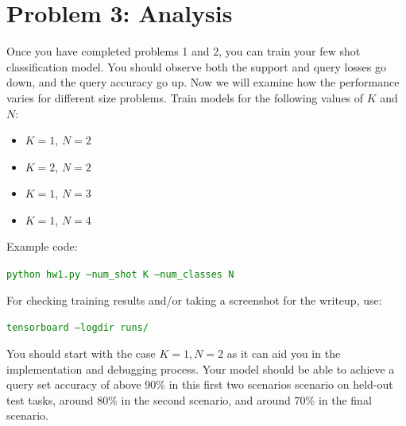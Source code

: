 \documentclass[12pt]{article}
\begin{document}
\section*{Problem 3: Analysis}

Once you have completed problems 1 and 2, you can train your few shot classification model. You should observe both the support and query losses go down, and the query accuracy go up. Now we will examine how the performance varies for different size problems.
Train models for the following values of $K$ and $N$:
\begin{itemize}
    \item $K = 1$, $N=2$ %
    \item $K = 2$, $N=2$ %
    \item $K = 1$, $N=3$ %
    \item $K = 1$, $N=4$ %
\end{itemize}

Example code:

\textcolor{green}{\texttt{python hw1.py --num\_shot K --num\_classes N}}

For checking training results and/or taking a screenshot for the writeup, use:

\textcolor{green}{\texttt{tensorboard --logdir runs/}}

You should start with the case $K=1 , N=2$ as it can aid you in the implementation and debugging process. Your model should be able to achieve a query set accuracy of above 90\% in this first two scenarios scenario on held-out test tasks, around 80\% in the second scenario, and around 70\% in the final scenario.
\end{document}
